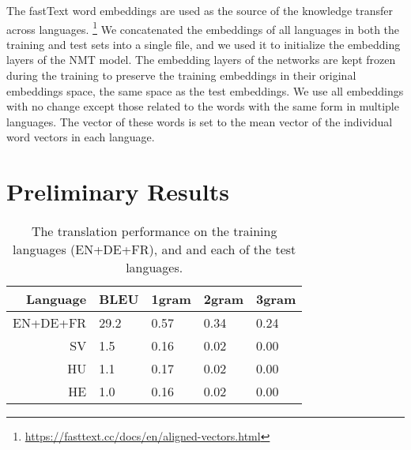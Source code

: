 \documentclass[11pt,a4paper]{article}
\begin{document}
The fastText word embeddings are used as the source of the knowledge transfer across languages.
\footnote{\url{https://fasttext.cc/docs/en/aligned-vectors.html}} 
We concatenated the embeddings of all languages in both the training and test sets into a single file, and we used it to initialize the embedding layers of the NMT model.
The embedding layers of the networks are kept frozen during the training to preserve the training embeddings in their original embeddings space, the same space as the test embeddings.  
We use all embeddings with no change except those related to the words with the same form in multiple languages.
The vector of these words is set to the mean vector of the individual word vectors in each language.  


\section{Preliminary Results}

\begin{table}
 \centering
 \begin{tabular}{r|*{4}{l}}
 \hline
 Language & BLEU & 1gram & 2gram & 3gram \\ [0.25ex]
 \hline\hline
 EN+DE+FR & 29.2 & 0.57 & 0.34 & 0.24 \\ %
 \hline
 SV & 1.5 & 0.16 & 0.02 & 0.00 \\ 
 HU & 1.1 & 0.17 & 0.02 & 0.00 \\
 HE & 1.0 & 0.16 & 0.02 & 0.00 \\
 \hline
 \end{tabular}
 \caption{The translation performance on the training languages (EN+DE+FR), and and each of the test languages.}
 \label{table:initial_results}
\end{table}
\end{document}
